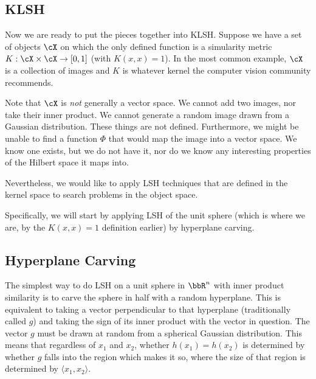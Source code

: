 \documentclass[twoside,11pt]{homework}
\begin{document}
\begin{multicols}{2}
\section{KLSH}

Now we are ready to put the pieces together into KLSH.  Suppose we
have a set of objects $\cX$ on which the only defined function is a
simularity metric $K:\cX \times \cX \rightarrow [0,1]$ (with
$K(x,x)=1$).  In the most
common example, $\cX$ is a collection of images and $K$ is whatever
kernel the computer
vision community recommends.

Note that $\cX$ is \emph{not} generally a vector space.  We cannot add two
images, nor take their inner product.  We cannot generate a random
image drawn from a Gaussian distribution.  These things are not
defined.  Furthermore, we might be unable to find a function $\Phi$ that would map
the image into a vector space.  We know one exists, but we do not have
it, nor do we know any interesting properties of the Hilbert space it
maps into.

Nevertheless, we would like to apply LSH techniques that are defined
in the kernel space to search problems in the object space.

Specifically, we will start by applying LSH of the unit sphere (which
is where we are, by the $K(x,x)=1$ definition earlier) by hyperplane
carving.

\subsection{Hyperplane Carving}

The simplest way to do LSH on a unit sphere in $\bbR^n$ with inner
product similarity is to carve the sphere in half with a random
hyperplane.  This is equivalent to taking a vector perpendicular to
that hyperplane (traditionally called $g$) and taking the sign of its
inner product with the vector in question.  The vector $g$ must be
drawn at random from a spherical Gaussian distribution.  This means
that regardless of $x_1$ and $x_2$, whether $h(x_1)=h(x_2)$  is
determined by whether $g$ falls into the region which makes it so,
where the size of that region is determined by $\langle x_1,x_2
\rangle$.





\end{multicols}
\end{document}
